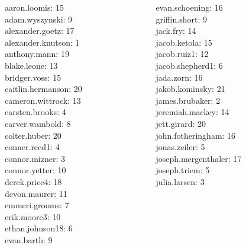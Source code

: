\documentclass[10pt]{beamer}
\begin{document}
\begin{frame}
\footnotesize 
\vfill 
\begin{columns}
\begin{column}{0.33\textwidth}
aaron.loomis: 15 \\ 
adam.wyszynski: 9 \\ 
alexander.goetz: 17 \\ 
alexander.knutson: 1 \\ 
anthony.mann: 19 \\ 
blake.leone: 13 \\ 
bridger.voss: 15 \\ 
caitlin.hermanson: 20 \\ 
cameron.wittrock: 13 \\ 
carsten.brooks: 4 \\ 
carver.wambold: 8 \\ 
colter.huber: 20 \\ 
conner.reed1: 4 \\ 
connor.mizner: 3 \\ 
connor.yetter: 10 \\ 
derek.price4: 18 \\ 
devon.maurer: 11 \\ 
emmeri.grooms: 7 \\ 
erik.moore3: 10 \\ 
ethan.johnson18: 6 \\ 
evan.barth: 9 \\\end{column}
\begin{column}{0.33\textwidth}
evan.schoening: 16 \\ 
griffin.short: 9 \\ 
jack.fry: 14 \\ 
jacob.ketola: 15 \\ 
jacob.ruiz1: 12 \\ 
jacob.shepherd1: 6 \\ 
jada.zorn: 16 \\ 
jakob.kominsky: 21 \\ 
james.brubaker: 2 \\ 
jeremiah.mackey: 14 \\ 
jett.girard: 20 \\ 
john.fotheringham: 16 \\ 
jonas.zeiler: 5 \\ 
joseph.mergenthaler: 17 \\ 
joseph.triem: 5 \\ 
julia.larsen: 3 \\ 

\end{column}
\end{columns}
\end{frame}
\end{document}
